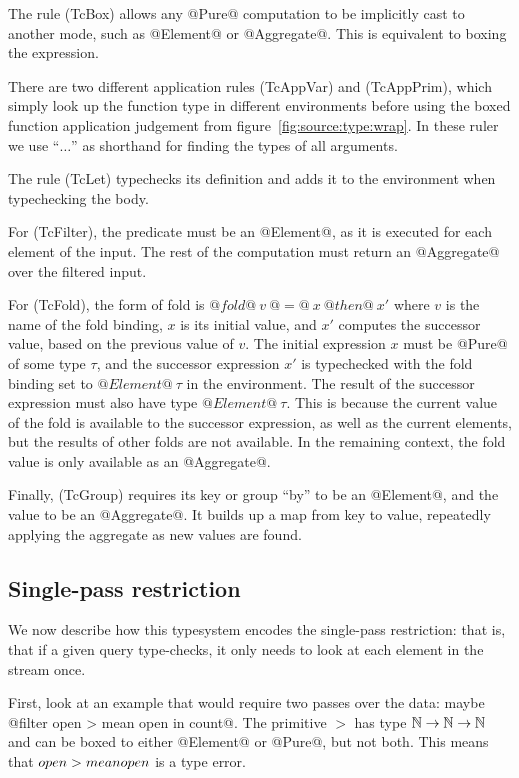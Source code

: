 The rule (TcBox) allows any @Pure@ computation to be implicitly cast to another mode, such as @Element@ or @Aggregate@.
This is equivalent to boxing the expression.

There are two different application rules (TcAppVar) and (TcAppPrim), which simply look up the function type in different environments before using the boxed function application judgement from figure~\ref{fig:source:type:wrap}.
In these ruler we use ``$\ldots$'' as shorthand for finding the types of all arguments.

The rule (TcLet) typechecks its definition and adds it to the environment when typechecking the body.

For (TcFilter), the predicate must be an @Element@, as it is executed for each element of the input.
The rest of the computation must return an @Aggregate@ over the filtered input.

For (TcFold), the form of fold is $@fold@~v~@=@~x~@then@~x'$ where $v$ is the name of the fold binding, $x$ is its initial value, and $x'$ computes the successor value, based on the previous value of $v$.
The initial expression $x$ must be @Pure@ of some type $\tau$, and the successor expression $x'$ is typechecked with the fold binding set to $@Element@~\tau$ in the environment.
The result of the successor expression must also have type $@Element@~\tau$.
This is because the current value of the fold is available to the successor expression, as well as the current elements, but the results of other folds are not available.
In the remaining context, the fold value is only available as an @Aggregate@.

Finally, (TcGroup) requires its key or group ``by'' to be an @Element@, and the value to be an @Aggregate@.
It builds up a map from key to value, repeatedly applying the aggregate as new values are found.

\subsection{Single-pass restriction}

We now describe how this typesystem encodes the single-pass restriction: that is, that if a given query type-checks, it only needs to look at each element in the stream once.

First, look at an example that would require two passes over the data: maybe @filter open > mean open in count@.
The primitive $>$ has type $\mathbb{N} \to \mathbb{N} \to \mathbb{N}$ and can be boxed to either @Element@ or @Pure@, but not both.
This means that $\mit{open} > \mit{mean open}$ is a type error.

